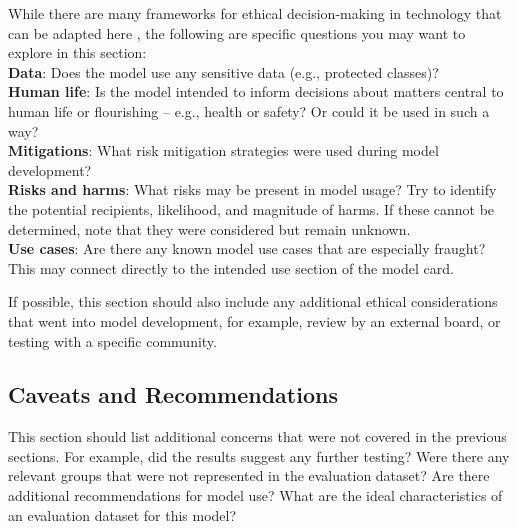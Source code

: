 While there are many frameworks for ethical decision-making in technology that can be adapted here \cite{markkula,deon,ethicalos}, the following are specific questions you may want to explore in this section: \\
{\bf Data}: Does the model use any sensitive data (e.g., protected classes)? \\
{\bf Human life}: Is the model intended to inform decisions about matters central to human life or flourishing -- e.g., health or safety?  Or could it be used in such a way? \\
{\bf Mitigations}:  What risk mitigation strategies were used during model development? \\
{\bf Risks and harms}: What risks may be present in model usage? Try to identify the potential recipients, likelihood, and magnitude of harms. If these cannot be determined, note that they were considered but remain unknown. \\
{\bf Use cases}: Are there any known model use cases that are especially fraught? This may connect directly to the intended use section of the model card.

If possible, this section should also include any additional ethical considerations that went into model development, for example, review by an external board, or testing with a specific community.

\subsection{Caveats and Recommendations}
This section should list additional concerns that were not covered in the previous sections. For example, did the results suggest any further testing?  Were there any relevant groups that were not represented in the evaluation dataset?  Are there additional recommendations for model use?  What are the ideal characteristics of an evaluation dataset for this model?